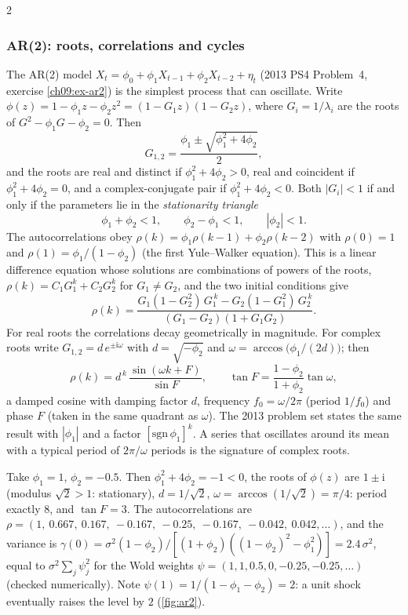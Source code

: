 \begin{paracol}{2}
\subsubsection{AR(2): roots, correlations and cycles}\label{ch09:sec-ar2}
The AR(2) model $X_t=\phi_0+\phi_1X_{t-1}+\phi_2X_{t-2}+\eta_t$ (2013 PS4 Problem~4, exercise \ref{ch09:ex-ar2})
is the simplest process that can oscillate. Write $\phi(z)=1-\phi_1z-\phi_2z^2=(1-G_1z)(1-G_2z)$, where
$G_i=1/\lambda_i$ are the roots of $G^2-\phi_1G-\phi_2=0$. Then
\[
  G_{1,2}=\frac{\phi_1\pm\sqrt{\phi_1^2+4\phi_2}}2,
\]
and the roots are real and distinct if $\phi_1^2+4\phi_2>0$, real and coincident if $\phi_1^2+4\phi_2=0$, and a
complex-conjugate pair if $\phi_1^2+4\phi_2<0$. Both $|G_i|<1$ if and only if the parameters lie in the
\emph{stationarity triangle}
\[
  \phi_1+\phi_2<1,\qquad \phi_2-\phi_1<1,\qquad |\phi_2|<1 .
\]
The autocorrelations obey $\rho(k)=\phi_1\rho(k-1)+\phi_2\rho(k-2)$ with $\rho(0)=1$ and
$\rho(1)=\phi_1/(1-\phi_2)$ (the first Yule--Walker equation). This is a linear difference equation whose solutions
are combinations of powers of the roots, $\rho(k)=C_1G_1^k+C_2G_2^k$ for $G_1\ne G_2$, and the two initial conditions give
\begin{equation}\label{ch09:eq-ar2rho}
  \rho(k)=\frac{G_1(1-G_2^2)\,G_1^{\,k}-G_2(1-G_1^2)\,G_2^{\,k}}{(G_1-G_2)(1+G_1G_2)} .
\end{equation}
For real roots the correlations decay geometrically in magnitude. For complex roots write
$G_{1,2}=d\,e^{\pm\mathrm i\omega}$ with $d=\sqrt{-\phi_2}$ and $\omega=\arccos\bigl(\phi_1/(2d)\bigr)$; then
\begin{equation}\label{ch09:eq-ar2osc}
  \rho(k)=d^{\,k}\,\frac{\sin(\omega k+F)}{\sin F},\qquad \tan F=\frac{1-\phi_2}{1+\phi_2}\tan\omega,
\end{equation}
a damped cosine with damping factor $d$, frequency $f_0=\omega/2\pi$ (period $1/f_0$) and phase $F$
(taken in the same quadrant as $\omega$). The 2013 problem set states the same result with $|\phi_1|$ and a factor $[\mathrm{sgn}\,\phi_1]^k$. A series that
oscillates around its mean with a typical period of $2\pi/\omega$ periods is the signature of complex roots.

\begin{example}\label{ch09:ex-ar2osc}
Take $\phi_1=1$, $\phi_2=-0.5$. Then $\phi_1^2+4\phi_2=-1<0$, the roots of $\phi(z)$ are $1\pm\mathrm i$ (modulus
$\sqrt2>1$: stationary), $d=1/\sqrt2$, $\omega=\arccos(1/\sqrt2)=\pi/4$: period exactly $8$, and $\tan F=3$. The
autocorrelations are $\rho=(1,\ 0.667,\ 0.167,\ -0.167,\ -0.25,\ -0.167,\ -0.042,\ 0.042,\dots)$, and the variance is
$\gamma(0)=\sigma^2(1-\phi_2)/[(1+\phi_2)((1-\phi_2)^2-\phi_1^2)]=2.4\,\sigma^2$, equal to $\sigma^2\sum_j\psi_j^2$ for the
Wold weights $\psi=(1,1,0.5,0,-0.25,-0.25,\dots)$ (checked numerically). Note $\psi(1)=1/(1-\phi_1-\phi_2)=2$: a unit shock
eventually raises the level by $2$ (\cref{fig:ar2}).
\end{example}


\end{paracol}
